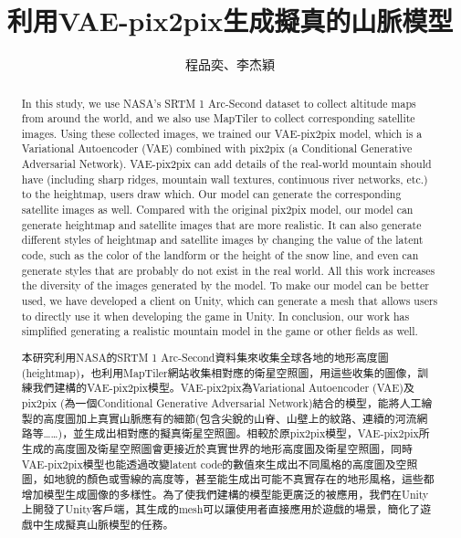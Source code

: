 \documentclass[a4paper, 12pt]{article}
\title{利用VAE-pix2pix生成擬真的山脈模型}
\author{程品奕、李杰穎}
\begin{document}

\tableofcontents
\newpage

\begin{abstract}

In this study, we use NASA’s SRTM 1 Arc-Second dataset to collect altitude maps from around the world, and we also use MapTiler to collect corresponding satellite images. Using these collected images, we trained our VAE-pix2pix model, which is a Variational Autoencoder (VAE) combined with pix2pix (a Conditional Generative Adversarial Network). VAE-pix2pix can add details of the real-world mountain should have (including sharp ridges, mountain wall textures, continuous river networks, etc.) to the heightmap, users draw which. Our model can generate the corresponding satellite images as well. Compared with the original pix2pix model, our model can generate heightmap and satellite images that are more realistic. It can also generate different styles of heightmap and satellite images by changing the value of the latent code, such as the color of the landform or the height of the snow line, and even can generate styles that are probably do not exist in the real world. All this work increases the diversity of the images generated by the model. To make our model can be better used, we have developed a client on Unity, which can generate a mesh that allows users to directly use it when developing the game in Unity. In conclusion, our work has simplified generating a realistic mountain model in the game or other fields as well.

\end{abstract}

\renewcommand{\abstractname}{摘要}
\begin{abstract}

本研究利用NASA的SRTM 1 Arc-Second資料集來收集全球各地的地形高度圖(heightmap)，也利用MapTiler網站收集相對應的衛星空照圖，用這些收集的圖像，訓練我們建構的VAE-pix2pix模型。VAE-pix2pix為Variational Autoencoder (VAE)及pix2pix (為一個Conditional Generative Adversarial Network)結合的模型，能將人工繪製的高度圖加上真實山脈應有的細節(包含尖銳的山脊、山壁上的紋路、連續的河流網路等……)，並生成出相對應的擬真衛星空照圖。相較於原pix2pix模型，VAE-pix2pix所生成的高度圖及衛星空照圖會更接近於真實世界的地形高度圖及衛星空照圖，同時VAE-pix2pix模型也能透過改變latent code的數值來生成出不同風格的高度圖及空照圖，如地貌的顏色或雪線的高度等，甚至能生成出可能不真實存在的地形風格，這些都增加模型生成圖像的多樣性。為了使我們建構的模型能更廣泛的被應用，我們在Unity上開發了Unity客戶端，其生成的mesh可以讓使用者直接應用於遊戲的場景，簡化了遊戲中生成擬真山脈模型的任務。

\end{abstract}
\end{document}
